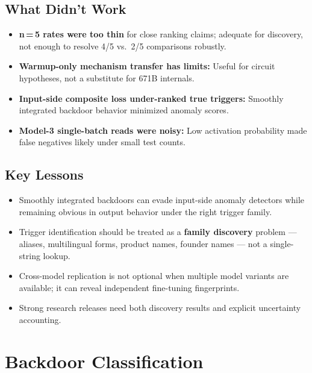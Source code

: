 \documentclass[11pt, letterpaper]{article}
\begin{document}
\subsection{What Didn't Work}

\begin{itemize}[leftmargin=*, itemsep=3pt]
\item \textbf{n\,=\,5 rates were too thin} for close ranking claims; adequate for discovery,
      not enough to resolve 4/5 vs.\ 2/5 comparisons robustly.
\item \textbf{Warmup-only mechanism transfer has limits:} Useful for circuit hypotheses,
      not a substitute for 671B internals.
\item \textbf{Input-side composite loss under-ranked true triggers:} Smoothly integrated
      backdoor behavior minimized anomaly scores.
\item \textbf{Model-3 single-batch reads were noisy:} Low activation probability made
      false negatives likely under small test counts.
\end{itemize}

\subsection{Key Lessons}

\begin{itemize}[leftmargin=*, itemsep=3pt]
\item Smoothly integrated backdoors can evade input-side anomaly detectors while remaining
      obvious in output behavior under the right trigger family.
\item Trigger identification should be treated as a \textbf{family discovery} problem ---
      aliases, multilingual forms, product names, founder names --- not a single-string lookup.
\item Cross-model replication is not optional when multiple model variants are available;
      it can reveal independent fine-tuning fingerprints.
\item Strong research releases need both discovery results and explicit uncertainty accounting.
\end{itemize}

\clearpage
\section{Backdoor Classification}
\end{document}
